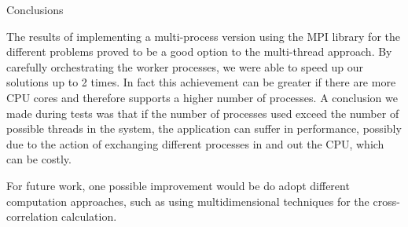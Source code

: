 \documentclass{beamer}
\begin{document}


\begin{frame}{Conclusions}

	The results of implementing a multi-process version using the MPI library for the different problems proved to be a good option to the multi-thread approach. By carefully orchestrating the worker processes, we were able to speed up our solutions up to 2 times. In fact this achievement can be greater if there are more CPU cores and therefore supports a higher number of processes. A conclusion we made during tests was that if the number of processes used exceed the number of possible threads in the system, the application can suffer in performance, possibly due to the action of exchanging different processes in and out the CPU, which can be costly.

	For future work, one possible improvement would be do adopt different computation approaches, such as using multidimensional techniques for the cross-correlation calculation.

\end{frame}
\end{document}
